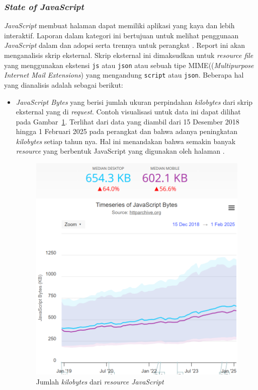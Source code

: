 \subsubsection{\textit{State of JavaScript}}
\label{subsub:stateofjs}

\textit{JavaScript} membuat halaman \web dapat memiliki aplikasi yang kaya dan lebih interaktif. Laporan dalam kategori ini bertujuan untuk melihat penggunaan \textit{JavaScript} dalam \web dan adopsi serta trennya untuk perangkat \mobile. Report ini akan menganalisis skrip eksternal. Skrip eksternal ini dimaksudkan untuk \textit{resource file} yang menggunakan ekstensi \verb|js| atau \verb|json| atau sebuah tipe MIME((\textit{Multipurpose Internet Mail Extensions}) yang mengandung \verb|script| atau \verb|json|. Beberapa hal yang dianalisis adalah sebagai berikut:
\begin{itemize}
    \item \textit{JavaScript Bytes} yang berisi jumlah ukuran perpindahan \textit{kilobytes} dari skrip eksternal yang di \textit{request}. Contoh visualisasi untuk data ini dapat dilihat pada Gambar~\ref{fig:jsbytes}. Terlihat dari data yang diambil dari 15 Desember 2018 hingga 1 Februari 2025 pada perangkat \desktop dan \mobile bahwa adanya peningkatan \textit{kilobytes} setiap tahun nya. Hal ini menandakan bahwa semakin banyak \textit{resource} yang berbentuk JavaScript yang digunakan oleh halaman \web.
    \begin{figure}[H]
        \centering
        \includegraphics[width=0.4\linewidth]{Gambar/Contoh JavaScript Bytes.png}
        \caption{Jumlah \textit{kilobytes} dari \textit{resource JavaScript}}
        \label{fig:jsbytes}
    \end{figure}


\end{itemize}
